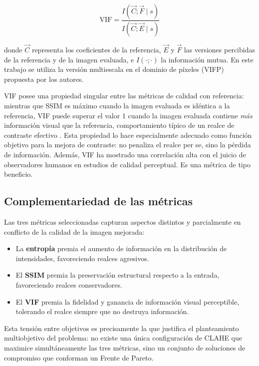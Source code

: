 \begin{equation}
\text{VIF} = \frac{I(\vec{C}; \vec{F} \mid s)}{I(\vec{C}; \vec{E} \mid s)}
\label{eq:vif}
\end{equation}

donde $\vec{C}$ representa los coeficientes de la referencia, $\vec{E}$ y $\vec{F}$ las versiones percibidas de la referencia y de la imagen evaluada, e $I(\cdot;\cdot)$ la información mutua. En este trabajo se utiliza la versión multiescala en el dominio de píxeles (VIFP) propuesta por los autores.

VIF posee una propiedad singular entre las métricas de calidad con referencia: mientras que SSIM es máximo cuando la imagen evaluada es idéntica a la referencia, VIF puede superar el valor $1$ cuando la imagen evaluada contiene \textit{más} información visual que la referencia, comportamiento típico de un realce de contraste efectivo \citep{Sheikh2006}. Esta propiedad lo hace especialmente adecuado como función objetivo para la mejora de contraste: no penaliza el realce per se, sino la pérdida de información. Además, VIF ha mostrado una correlación alta con el juicio de observadores humanos en estudios de calidad perceptual. Es una métrica de tipo beneficio.

\subsection{Complementariedad de las métricas}

Las tres métricas seleccionadas capturan aspectos distintos y parcialmente en conflicto de la calidad de la imagen mejorada:

\begin{itemize}
    \item La \textbf{entropía} premia el aumento de información en la distribución de intensidades, favoreciendo realces agresivos.
    \item El \textbf{SSIM} premia la preservación estructural respecto a la entrada, favoreciendo realces conservadores.
    \item El \textbf{VIF} premia la fidelidad y ganancia de información visual perceptible, tolerando el realce siempre que no destruya información.
\end{itemize}

Esta tensión entre objetivos es precisamente la que justifica el planteamiento multiobjetivo del problema: no existe una única configuración de CLAHE que maximice simultáneamente las tres métricas, sino un conjunto de soluciones de compromiso que conforman un Frente de Pareto.

